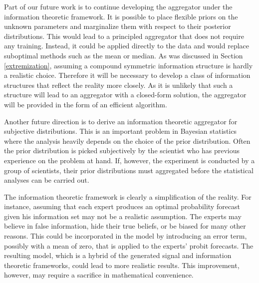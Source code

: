 \documentclass[11pt,twoside]{article}
\begin{document}
Part of our future work is to continue developing the aggregator under the information theoretic framework. It is possible to place flexible priors on the unknown parameters and marginalize them with respect to their posterior distributions. This would lead to a principled aggregator that does not require any training. Instead, it could be applied directly to the data and would replace suboptimal methods such as the mean or median. As was discussed in Section \ref{extremization}, assuming a compound symmetric information structure is hardly a realistic choice. Therefore it will be necessary to develop a class of information structures that reflect the reality more closely. As it is unlikely that such a structure will lead to an aggregator with a closed-form solution, the aggregator will be provided in the form of an efficient algorithm.

Another future direction is to derive an information theoretic aggregator for subjective distributions. This is an important problem in Bayesian statistics where the analysis heavily depends on the choice of the prior distribution. Often the prior distribution is picked subjectively by the scientist who has previous experience on the problem at hand. If, however, the experiment is conducted by a group of scientists, their prior distributions must aggregated before the statistical analyses can be carried out. 
 
The information theoretic framework is clearly a simplification of the reality. For instance, assuming that each expert produces an optimal probability forecast given his information set may not be a realistic assumption. The experts may believe in false information, hide their true beliefs, or be biased for many other reasons. This could be incorporated in the model by introducing an error term, possibly with a mean of zero, that is applied to the experts' probit forecasts. The resulting model, which is a hybrid of the generated signal and information theoretic frameworks, could lead to more realistic results. This improvement, however, may require a sacrifice in mathematical convenience. 


%

\end{document}
